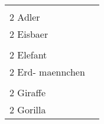 \documentclass{article}\usepackage[ngerman]{babel}\usepackage{geometry}\usepackage{lmodern}
\begin{document}
\begin{table}[p]
  \begin{tabular}{ll}    \hspace{-2em}    \fbox{\begin{minipage}[t][6cm][t]{8cm}
        \fontsize{45}{54} \selectfont
        \phantom{ }\\
      \phantom{ }2 Adler    \end{minipage}}
    &
\fbox{\begin{minipage}[t][6cm][t]{8cm}
        \fontsize{45}{54} \selectfont
        \phantom{ }\\
        \phantom{ } 2 Eisbaer      \end{minipage}}\\    \hspace{-2em}    \fbox{\begin{minipage}[t][6cm][t]{8cm}
        \fontsize{45}{54} \selectfont
        \phantom{ }\\
      \phantom{ }2 Elefant    \end{minipage}}
    &
\fbox{\begin{minipage}[t][6cm][t]{8cm}
        \fontsize{45}{54} \selectfont
        \phantom{ }\\
        \phantom{ } 2 Erd- maennchen      \end{minipage}}\\    \hspace{-2em}    \fbox{\begin{minipage}[t][6cm][t]{8cm}
        \fontsize{45}{54} \selectfont
        \phantom{ }\\
      \phantom{ }2 Giraffe    \end{minipage}}
    &
\fbox{\begin{minipage}[t][6cm][t]{8cm}
        \fontsize{45}{54} \selectfont
        \phantom{ }\\
        \phantom{ } 2 Gorilla      \end{minipage}}\\\end{tabular}
\end{table}
\end{document}

